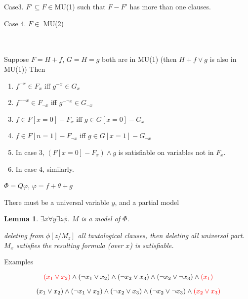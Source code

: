 \documentclass[12pt]{article}
\newtheorem{lemma}{Lemma}
\begin{document}
Case3. $F'\subseteq F\in $MU(1) such that $F-F'$ has more than one clauses. 

Case 4. $F\in$ MU(2)


\ \ \\ \ \\
Suppose $F=H+f$, $G=H=g$ both are in MU(1) (then $H+f\vee g$ is also in MU(1))
%
Then 


\begin{enumerate}

\item $f^{-x}\in F_x$ iff $g^{-x}\in G_x$

\item $f^{-\neg x}\in F_{\neg x}$ iff $g^{-\neg x}\in G_{\neg x}$

\item $f\in F[x=0]-F_x$ iff $g\in G[x=0]-G_x$

\item $f\in F[n=1]-F_{\neg x}$ iff $g\in G[x=1]-G_{\neg x}$ 

\item In case 3, $(F[x=0]-F_x)\wedge g$ is satisfiable on variables not in $F_x$.

\item In case 4, similarly. 

\end{enumerate}



$\Phi=Q\varphi$, $\varphi=f+\theta + g$


There must be a universal variable $y$, and a partial model 



\begin{lemma}
$\exists x\forall y\exists z \phi$. 
$M$ is a model of $\Phi$. 

deleting from $\phi[z/M_z]$ all tautological clauses, then deleting all universal part. $M_x$ satisfies the resulting formula (over $x$) is satisfiable. 
\end{lemma}

Examples

$$\color{red} (x_1\vee x_2) \color{black} \wedge (\neg x_1\vee x_2) \wedge (\neg x_2\vee x_3)\wedge (\neg x_2\vee \neg x_3)\wedge \color{red} (x_1)\color{black}$$


$$\color{black} (x_1\vee x_2) \color{black} \wedge (\neg x_1\vee x_2) \wedge (\neg x_2\vee x_3)\wedge (\neg x_2\vee \neg x_3)\wedge \color{red} (x_2\vee x_3)\color{black}$$
\end{document}
